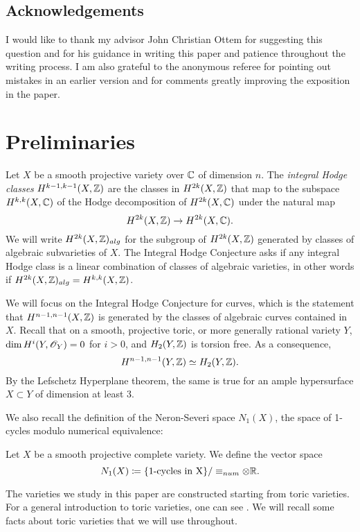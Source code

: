 \subsection*{Acknowledgements}
I would like to thank my advisor John Christian Ottem for suggesting this question and for his guidance in writing this paper and patience throughout the writing process. I am also grateful to the anonymous referee for pointing out mistakes in an earlier version and for comments greatly improving the exposition in the paper.

\section{Preliminaries}
\label{sec:Preliminaries}

Let $X$ be a smooth projective variety over $\mathbb{C}$ of dimension $n$. The \emph{integral Hodge classes}  $H^{k-1,k-1}(X,\mathbb{Z})$ are the classes in $H^{2k}(X,\mathbb{Z})$ that map to the subspace $H^{k,k}(X,\mathbb{C})$ of the Hodge decomposition of $H^{2k}(X,\mathbb{C})$ under the natural map 
\[H^{2k}(X,\mathbb{Z}) \to H^{2k}(X,\mathbb{C}).\]
We will write $H^{2k}(X,\mathbb{Z})_{alg}$ for the subgroup of $H^{2k}(X,\mathbb{Z})$ generated by classes of algebraic subvarieties of $X$. The Integral Hodge Conjecture asks if any integral Hodge class is a linear combination of classes of algebraic varieties, in other words if $H^{2k}(X,\mathbb{Z})_{alg} = H^{k,k}(X,\mathbb{Z})$.


We will focus on the Integral Hodge Conjecture for curves, which is the statement that $H^{n-1,n-1}(X,\mathbb{Z})$ is generated by the classes of algebraic curves contained in $X$. Recall that on a smooth, projective toric, or more generally rational variety $Y$, $\dim H^i(Y,\mathscr{O}_Y) = 0$ for $i > 0$, and $H_2(Y,\mathbb{Z})$ is torsion free. As a consequence,
\[ H^{n-1,n-1}(Y,\mathbb{Z}) \simeq H_2(Y,\mathbb{Z}).\]
By the Lefschetz Hyperplane theorem, the same is true for an ample hypersurface $X \subset Y$ of dimension at least 3.

We also recall the definition of the Neron-Severi space $N_1(X)$, the space of 1-cycles modulo numerical equivalence:
\begin{definition}
Let $X$ be a smooth projective complete variety. We define the vector space
\[N_1(X) \coloneqq \lbrace\text{1-cycles in X}\rbrace/\equiv_{num} \otimes \mathbb{R}. \]
\end{definition}

The varieties we study in this paper are constructed starting from toric varieties. For a general introduction to toric varieties, one can see \eg \cite{CLS11}. We will recall some facts about toric varieties that we will use throughout.

